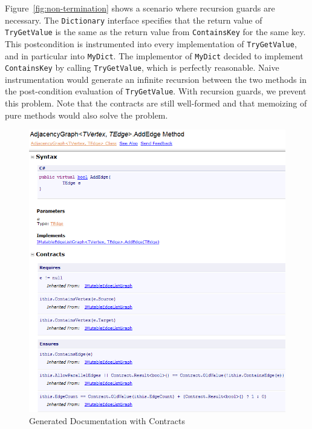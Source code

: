 \documentclass{sig-alternate}
\begin{document}
Figure~\ref{fig:non-termination} shows a scenario where recursion
guards are necessary. The \lstinline{Dictionary} interface specifies
that the return value of \lstinline{TryGetValue} is the same as the
return value from \lstinline{ContainsKey} for the same key. This
postcondition is instrumented into every implementation of
\lstinline{TryGetValue}, and in particular into
\lstinline{MyDict}. The implementor of \lstinline{MyDict} decided to
implement \lstinline{ContainsKey} by calling \lstinline{TryGetValue},
which is perfectly reasonable. Naive instrumentation would generate an
infinite recursion between the two methods in the post-condition
evaluation of \lstinline{TryGetValue}. With recursion guards, we
prevent this problem. Note that the contracts are still well-formed
and that memoizing of pure methods would also solve the problem.

\begin{center}
\begin{figure}[tb!]
\begin{center}
  \hspace*{-2mm}\includegraphics[width=1.05\columnwidth]{docexample.png}
\end{center}
\caption{Generated Documentation with Contracts}
\label{fig:doc}
\end{figure}
\end{center}
\end{document}
